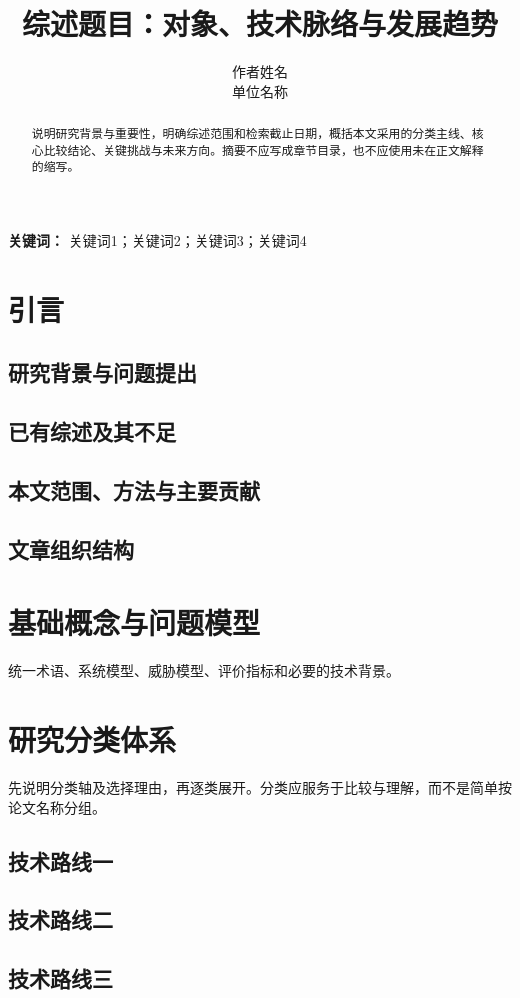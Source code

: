 \documentclass[UTF8,a4paper,10.5pt]{ctexart}
\title{综述题目：对象、技术脉络与发展趋势}
\author{作者姓名\\单位名称}
\date{}
\begin{document}
\maketitle

\begin{abstract}
说明研究背景与重要性，明确综述范围和检索截止日期，概括本文采用的分类主线、核心比较结论、关键挑战与未来方向。摘要不应写成章节目录，也不应使用未在正文解释的缩写。
\end{abstract}

\noindent\textbf{关键词：} 关键词1；关键词2；关键词3；关键词4

\section{引言}
\subsection{研究背景与问题提出}
\subsection{已有综述及其不足}
\subsection{本文范围、方法与主要贡献}
\subsection{文章组织结构}

\section{基础概念与问题模型}
统一术语、系统模型、威胁模型、评价指标和必要的技术背景。

\section{研究分类体系}
先说明分类轴及选择理由，再逐类展开。分类应服务于比较与理解，而不是简单按论文名称分组。

\subsection{技术路线一}
\subsection{技术路线二}
\subsection{技术路线三}
\end{document}
